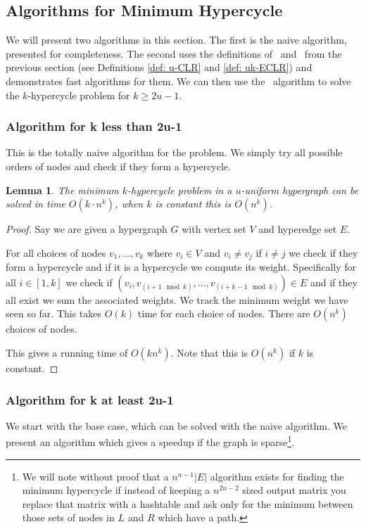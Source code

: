 \documentclass[11pt,letterpaper,pdftex]{article}
\newtheorem{lemma}[theorem]{Lemma}
\newcounter{definition}
\begin{document}
\subsection{Algorithms for Minimum Hypercycle}
We will present two algorithms in this section. The first is the naive algorithm, presented for completeness. The second uses the definitions of 
\uCLR~and ~from the previous section (see Definitions \ref{def: u-CLR} and \ref{def: uk-ECLR}) and demonstrates fast algorithms for them. We can then use the ~algorithm to solve the $k$-hypercycle problem for $k\geq 2u-1$.

\subsubsection{Algorithm for k less than 2u-1}
This is the totally naive algorithm for the problem. We simply try all possible orders of nodes and check if they form a hypercycle.

\begin{lemma}
    The minimum $k$-hypercycle problem in a $u$-uniform hypergraph can be solved in time $O(k \cdot n^k)$, when $k$ is constant this is $O(n^k)$. 
    \label{lem:shortweightedkhypercyclealg}
\end{lemma}
\begin{proof}
Say we are given a hypergraph $G$ with vertex set $V$ and hyperedge set $E$.

For all choices of nodes $v_1,\ldots, v_k$ where $v_i \in V$ and $v_i \ne v_j$ if $i\ne j$ we check if they form a hypercycle and if it is a hypercycle we compute its weight. Specifically for all $i \in [1,k]$ we check if $(v_{i}, v_{(i+1 \mod{k})}, \ldots, v_{(i+k-1 \mod{k})}) \in E$ and if they all exist we sum the associated weights. We track the minimum weight we have seen so far.  This takes $O(k)$ time for each choice of nodes. There are $O(n^k)$ choices of nodes. 

This gives  a running time of $O(k n^k)$. Note that this is $O(n^k)$ if $k$ is constant. 
\end{proof}

\subsubsection{Algorithm for k at least 2u-1}
We start with the base case, which can be solved with the naive algorithm. We present an algorithm which gives a speedup if the graph is sparse\footnote{We will note without proof that a $n^{u-1} |E|$ algorithm exists for finding the minimum hypercycle if instead of keeping a $n^{2u-2}$ sized output matrix you replace that matrix with a hashtable and ask only for the minimum between those sets of nodes in $L$ and $R$ which have a path.}. 
\end{document}
